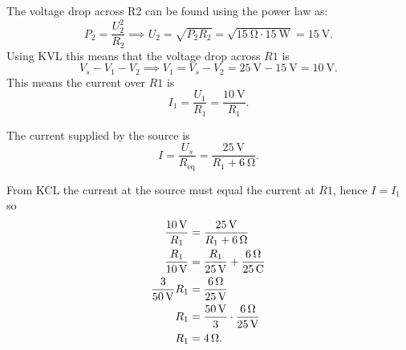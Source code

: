 \begin{derivation}
    The voltage drop across R2 can be found using the power law as:
    \begin{equation*}
      P_2 = \frac{U_2^2}{R_2} \implies U_2 = \sqrt{P_2R_2} = \sqrt{\qty{15}{\ohm} \cdot \qty{15}{\W}} = \qty{15}{\V} 
    .\end{equation*}
    Using KVL this means that the voltage drop across $R1$ is
    \begin{equation*}
      V_s - V_1 - V_2 \implies V_1 = V_s - V_2 = \qty{25}{\V}  - \qty{15}{\V}  = \qty{10}{\V} 
    .\end{equation*}
    This means the current over $R1$ is
    \begin{equation*}
      I_1 = \frac{U_1}{R_1} = \frac{\qty{10}{\V}}{R_1}
    .\end{equation*}

    The current supplied by the source is
    \begin{equation*}
      I = \frac{U_s}{R_{\text{eq}}} = \frac{\qty{25}{\V} }{R_1 + \qty{6}{\ohm}} 
    .\end{equation*}

    From KCL the current at the source must equal the current at $R1$, hence $I = I_1$ so
    \begin{align*}
      \frac{\qty{10}{\V}}{R_1} &= \frac{\qty{25}{\V}}{ R_1 + \qty{6}{\ohm} } \\
      \frac{R_1}{\qty{10}{\V}} &= \frac{R_1}{\qty{25}{\V} } + \frac{\qty{6}{\ohm} }{\qty{25}{\C} }\\
      \frac{3}{\qty{50}{\V} } R_1 &= \frac{\qty{6}{\ohm} }{\qty{25}{\V} } \\
      R_1 &= \frac{\qty{50}{\V} }{3} \cdot \frac{\qty{6}{\ohm} }{\qty{25}{\V} } \\
      R_1 &= \qty{4}{\ohm} 
    .\end{align*}
  \end{derivation}


